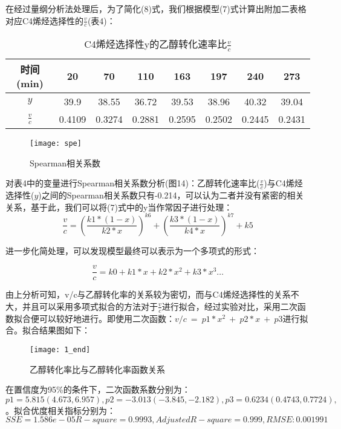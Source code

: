\documentclass[withoutpreface,bwprint]{cumcmthesis} %
\begin{document}
在经过量纲分析法处理后，为了简化(8)式，我们根据模型(7)式计算出附加二表格对应C4烯烃选择性的$\frac{v}{c}$(表4)：
\begin{table}[!htbp]
	\caption{C4烯烃选择性y的乙醇转化速率比$\frac{v}{c}$}\label{tab:001} \centering
	\begin{tabular}{cccccccc}
		\toprule[1.5pt]
		时间(min)& 20 & 70 & 110 & 163 & 197 & 240 & 273 \\
		\midrule[1pt]
		$y$ & 39.9 & 38.55 & 36.72 & 39.53 & 38.96 & 40.32 & 39.04 \\
		$\frac{v}{c}$& 0.4109 & 0.3274 & 0.2881 & 0.2595 & 0.2502 & 0.2445 & 0.2431 \\
		\bottomrule[1.5pt]
	\end{tabular}
\end{table}

\begin{figure}[!h]
	\centering
	\texttt{[image: spe]}
	\caption{Spearman相关系数}
	\label{fig:circuit-diagram1}
\end{figure}

对表4中的变量进行Spearman相关系数分析(图14)：乙醇转化速率比($\frac{v}{c}$)与C4烯烃选择性($y$)之间的Spearman相关系数只有-0.214，可以认为二者并没有紧密的相关关系，基于此，我们可以将(7)式中的y当作常因子进行处理：
\begin{equation*}
	\frac{v}{c}=\left(\frac{k1\ast\left(1-x\right)}{k2\ast x}\right)^{k6}+\left(\frac{k3\ast\left(1-x\right)}{k4\ast x}\right)^{k7}+k5
\end{equation*}

进一步化简处理，可以发现模型最终可以表示为一个多项式的形式：

\begin{equation*}
	\frac{v}{c}=k0+k1\ast x+k2\ast x^2+k3\ast x^3\ldots
\end{equation*}

由上分析可知，v/c与乙醇转化率的关系较为密切，而与C4烯烃选择性的关系不大，并且可以采用多项式拟合的方法对于$\frac{v}{c}$进行拟合，经过实验对比，采用二次函数拟合便可以较好地进行。即使用二次函数：$v/c\ =\ p1\ast x^2\ +\ p2\ast x\ +\ p3$进行拟合。拟合结果图如下：
\begin{figure}[!h]
	\centering
	\texttt{[image: 1\_end]}
	\caption{乙醇转化率比与乙醇转化率函数关系}
	\label{fig:circuit-diagram1}
\end{figure}
在置信度为95\%的条件下，二次函数系数分别为：$ p1 =       5.815  (4.673, 6.957),
p2 =      -3.013  (-3.845, -2.182),
p3 =      0.6234  (0.4743, 0.7724),
 $。拟合优度相关指标分别为：$ SSE = 1.586e-05
 R-square= 0.9993,
 Adjusted R-square= 0.999,
 RMSE: 0.001991
 $
 
\end{document}
